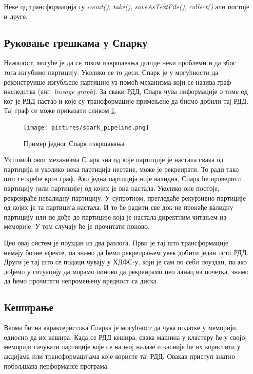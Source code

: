 \documentclass[12pt,oneside]{memoir}
\begin{document}
Неке од трансформација су \textit{count()}, \textit{take()}, \textit{saveAsTextFile()}, \textit{collect()} али постоје и друге. \cite{spark_rdd}

\subsection{Руковање грешкама у Спарку}
\label{subsec:spark_dags}

Нажалост, могуће је да се током извршавања догоде неки проблеми и да због тога изгубимо партицију. Уколико се то деси, Спарк је у могућности да реконструише изгубљене партиције уз помоћ механизма који се назива граф наследства (енг. \textit{lineage graph}). За сваки РДД, Спарк чува информације о томе од ког је РДД настао и које су трансформације примењене да бисмо добили тај РДД. Тај граф се може приказати сликом \ref{fig:sprk_ppln}.

\begin{figure}[!ht]
  \centering
  \texttt{[image: pictures/spark\_pipeline.png]}
  \caption{Пример једног Спарк извршавања}
  \label{fig:sprk_ppln}
\end{figure}

Уз помоћ овог механизма Спарк зна од које партиције је настала свака од партиција и уколико нека партиција нестане, може је рекреирати. То ради тако што се креће кроз граф. Ако једна партиција није валидна, Спарк ће проверити партицију (или партиције) од којих је она настала. Уколико оне постоје, рекреираће невалидну партицију. У супротном, прегледаће рекурзивно партиције од којих је та партиција настала. И то ће радити све док не пронађе валидну партицију или не дође до партиције која је настала директним читањем из меморије. У том случају ће је прочитати поново. \cite{hadoop_learning}

Цео овај систем је поуздан из два разлога. Први је тај што трансформације немају бочне ефекте, па знамо да ћемо рекреирањем увек добити један исти РДД. Други је тај што се подаци чувају у ХДФС-у, који је сам по себи поуздан, па ако дођемо у ситуацију да морамо поново да рекреирамо цео ланац из почетка, знамо да ћемо прочитати непромењену вредност са диска.

\subsection{Кеширање}
\label{subsec:spark_persist}

Веома битна карактеристика Спарка је могућност да чува податке у меморији, односно да их кешира. Када се РДД кешира, свака машина у кластеру ће у својој меморији сачувати партиције које се на њој налазе и касније ће их користити у акцијама или трансформацијама које користе тај РДД. Овакав приступ знатно побољшава перформансе програма. \cite{spark_rdd}
\end{document}
